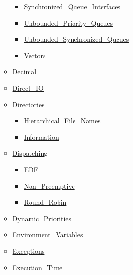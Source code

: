\documentclass[english]{article}
\begin{document}
\begin{scriptsize}
\begin{multicols*}{5}
\begin{itemize}[leftmargin=0mm]
\begin{itemize}[leftmargin=5mm]
\begin{itemize}[leftmargin=5mm]
	\item[] \href{http://www.ada-auth.org/standards/22rm/html/RM-A-18-27.html}{Synchronized\_Queue\_Interfaces}
	\item[] \href{http://www.ada-auth.org/standards/22rm/html/RM-A-18-30.html}{Unbounded\_Priority\_Queues}
	\item[] \href{http://www.ada-auth.org/standards/22rm/html/RM-A-18-28.html}{Unbounded\_Synchronized\_Queues}
	\item[] \href{http://www.ada-auth.org/standards/22rm/html/RM-A-18-2.html}{Vectors}
	\end{itemize}
  \item[] \href{http://www.ada-auth.org/standards/22rm/html/RM-F-2.html}{Decimal}
  \item[] \href{http://www.ada-auth.org/standards/22rm/html/RM-A-8-4.html}{Direct\_IO}
  \item[] \href{http://www.ada-auth.org/standards/22rm/html/RM-A-16.html}{Directories}
	\begin{itemize}[leftmargin=5mm]
	\item[] \href{http://www.ada-auth.org/standards/22rm/html/RM-A-16-1.html}{Hierarchical\_File\_Names}
	\item[] \href{http://www.ada-auth.org/standards/22rm/html/RM-A-16.html}{Information}
	\end{itemize}
  \item[] \href{http://www.ada-auth.org/standards/22rm/html/RM-D-2-1.html}{Dispatching}
	\begin{itemize}[leftmargin=5mm]
	\item[] \href{http://www.ada-auth.org/standards/22rm/html/RM-D-2-6.html}{EDF}
	\item[] \href{http://www.ada-auth.org/standards/22rm/html/RM-D-2-4.html}{Non\_Preemptive}
	\item[] \href{http://www.ada-auth.org/standards/22rm/html/RM-D-2-5.html}{Round\_Robin}
	\end{itemize}
  \item[] \href{http://www.ada-auth.org/standards/22rm/html/RM-D-5-1.html}{Dynamic\_Priorities}
  \item[] \href{http://www.ada-auth.org/standards/22rm/html/RM-A-17.html}{Environment\_Variables}
  \item[] \href{http://www.ada-auth.org/standards/22rm/html/RM-11-4-1.html}{Exceptions}
  \item[] \href{http://www.ada-auth.org/standards/22rm/html/RM-D-14.html}{Execution\_Time}
	\begin{itemize}[leftmargin=5mm]

\end{itemize}
\end{itemize}
\end{itemize}
\end{multicols*}
\end{scriptsize}
\end{document}
